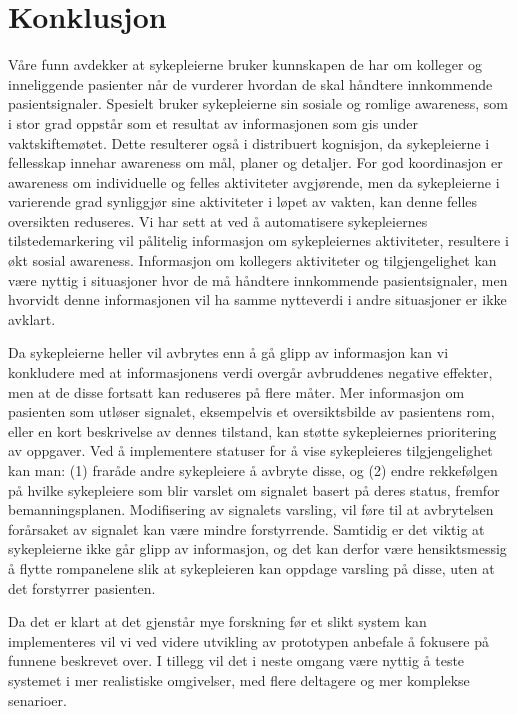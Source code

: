 \chapter{Konklusjon}
\label{chp:konklusjon}

Våre funn avdekker at sykepleierne bruker kunnskapen de har om kolleger og inneliggende pasienter når de vurderer hvordan de skal håndtere innkommende pasientsignaler. Spesielt bruker sykepleierne sin sosiale og romlige awareness, som i stor grad oppstår som et resultat av informasjonen som gis under vaktskiftemøtet. Dette resulterer også i distribuert kognisjon, da sykepleierne i fellesskap innehar awareness om mål, planer og detaljer. For god koordinasjon er awareness om individuelle og felles aktiviteter avgjørende, men da sykepleierne i varierende grad synliggjør sine aktiviteter i løpet av vakten, kan denne felles oversikten reduseres. Vi har sett at ved å automatisere sykepleiernes tilstedemarkering vil pålitelig informasjon om sykepleiernes aktiviteter, resultere i økt sosial awareness. Informasjon om kollegers aktiviteter og tilgjengelighet kan være nyttig i situasjoner hvor de må håndtere innkommende pasientsignaler, men hvorvidt denne informasjonen vil ha samme nytteverdi i andre situasjoner er ikke avklart.

\noindent
Da sykepleierne heller vil avbrytes enn å gå glipp av informasjon kan vi konkludere med at informasjonens verdi overgår avbruddenes negative effekter, men at de disse fortsatt kan reduseres på flere måter. Mer informasjon om pasienten som utløser signalet, eksempelvis et oversiktsbilde av pasientens rom, eller en kort beskrivelse av dennes tilstand, kan støtte sykepleiernes prioritering av oppgaver. Ved å implementere statuser for å vise sykepleieres tilgjengelighet kan man: (1) fraråde andre sykepleiere å avbryte disse, og (2) endre rekkefølgen på hvilke sykepleiere som blir varslet om signalet basert på deres status, fremfor bemanningsplanen.  Modifisering av signalets varsling, vil føre til at avbrytelsen forårsaket av signalet kan være mindre forstyrrende. Samtidig er det viktig at sykepleierne ikke går glipp av informasjon, og det kan derfor være hensiktsmessig å flytte rompanelene slik at sykepleieren kan oppdage varsling på disse, uten at det forstyrrer pasienten. 

\noindent
Da det er klart at det gjenstår mye forskning før et slikt system kan implementeres vil vi ved videre utvikling av prototypen anbefale å fokusere på funnene beskrevet over. I tillegg vil det i neste omgang være nyttig å teste systemet i mer realistiske omgivelser, med flere deltagere og mer komplekse senarioer.
